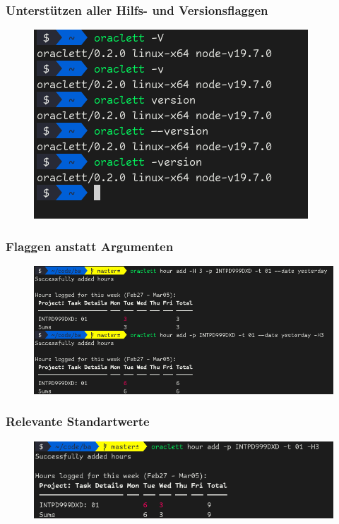 \documentclass{beamer}
\begin{document}
\begin{frame}
  \frametitle{Unterstützen aller Hilfs- und Versionsflaggen}

  \begin{figure}[H]
    \centering
    \includegraphics[scale=0.5]{demo-versions.png}
  \end{figure}
\end{frame}

\begin{frame}
  \frametitle{Flaggen anstatt Argumenten}

  \begin{figure}[H]
    \centering
    \includegraphics[scale=0.38]{demo-flags-over-args.png}
  \end{figure}
\end{frame}

\begin{frame}
  \frametitle{Relevante Standartwerte}

  \begin{figure}[H]
    \centering
    \includegraphics[scale=0.4]{demo-defaults.png}
  \end{figure}
\end{frame}
\end{document}
